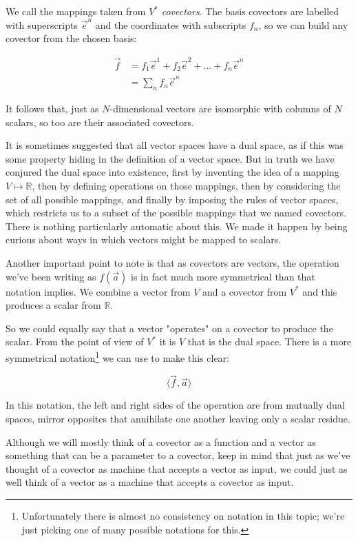 We call the mappings taken from $V^*$ \textit{covectors}. The basis covectors are labelled with superscripts $\vec{e}^n$ and the coordinates with subscripts $f_n$, so we can build any covector from the chosen basis:

\begin{equation}
    \begin{split}
    \vec{f} &= f_1 \vec{e}^1 + f_2 \vec{e}^2 + ... + f_n \vec{e}^n \\
            &= \sum_n f_n \vec{e}^n
    \end{split}
\end{equation}

It follows that, just as $N$-dimensional vectors are isomorphic with columns of $N$ scalars, so too are their associated covectors.

It is sometimes suggested that all vector spaces have a dual space, as if this was some property hiding in the definition of a vector space. But in truth we have conjured the dual space into existence, first by inventing the idea of a mapping $V \mapsto \mathbb{R}$, then by defining operations on those mappings, then by considering the set of all possible mappings, and finally by imposing the rules of vector spaces, which restricts us to a subset of the possible mappings that we named covectors. There is nothing particularly automatic about this. We made it happen by being curious about ways in which vectors might be mapped to scalars.

Another important point to note is that as covectors are vectors, the operation we've been writing as $f(\vec{a})$ is in fact much more symmetrical than that notation implies. We combine a vector from $V$ and a covector from $V^*$ and this produces a scalar from $\mathbb{R}$. 

So we could equally say that a vector "operates" on a covector to produce the scalar. From the point of view of $V^*$ it is $V$ that is the dual space. There is a more symmetrical notation\footnote{Unfortunately there is almost no consistency on notation in this topic; we're just picking one of many possible notations for this.} we can use to make this clear:

$$\langle \vec{f},\vec{a}\rangle$$

In this notation, the left and right sides of the operation are from mutually dual spaces, mirror opposites that annihilate one another leaving only a scalar residue.

Although we will mostly think of a covector as a function and a vector as something that can be a parameter to a covector, keep in mind that just as we've thought of a covector as machine that accepts a vector as input, we could just as well think of a vector as a machine that accepts a covector as input.

